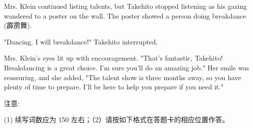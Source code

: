 \documentclass{英语试卷}
\begin{document}
\par Mrs. Klein continued listing talents, but Takehito stopped listening as his gazing wandered to a poster on the wall. The poster showed a person doing breakdance (霹雳舞).\par
\par "Dancing. I will breakdance!" Takehito interrupted.\par
\par Mrs. Klein's eyes lit up with encouragement. "That's fantastic, Takehito! Breakdancing is a great choice. I'm sure you'll do an amazing job." Her smile was reassuring, and she added, "The talent show is three months away, so you have plenty of time to prepare. I'll be here to help you prepare if you need it."\par
\par 注意:\par
\par (1) 续写词数应为 150 左右；（2）请按如下格式在答题卡的相应位置作答。\par
{}
\end{document}
